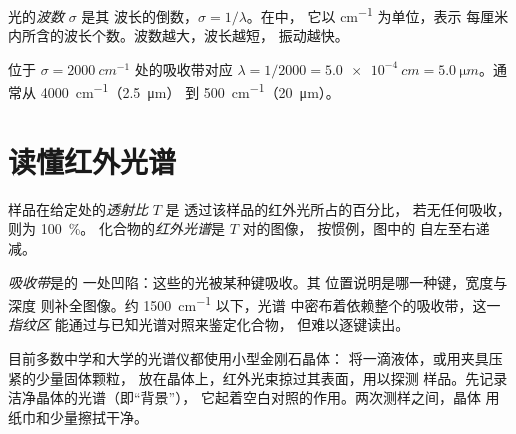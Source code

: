 \begin{definition}[波数]\label{def:g11:infrared:wavenumber}
光的\emph{波数} $\sigma$ 是其
波长的倒数，$\sigma = 1/\lambda$。在中，
它以 \si{cm^{-1}} 为单位，表示
每厘米内所含的波长个数。波数越大，波长越短，
振动越快。
\end{definition}

\begin{example}[由波数求波长]\label{ex:g11:infrared:convert}
位于 $\sigma = \qty{2000}{cm^{-1}}$ 处的吸收带对应
$\lambda = 1/2000 = \qty{5.0e-4}{cm} = \qty{5.0}{\micro m}$。通常从 \qty{4000}{cm^{-1}}（\qty{2.5}{\micro m}）
到 \qty{500}{cm^{-1}}（\qty{20}{\micro m}）。
\end{example}

\section{读懂红外光谱}

\begin{definition}\label{def:g11:infrared:spectrum}
样品在给定处的\emph{透射比} $T$ 是
透过该样品的红外光所占的百分比，
若无任何吸收，则为 \qty{100}{\percent}。
化合物的\emph{红外光谱}是 $T$ 对的图像，
按惯例，图中的
自左至右递减。
\end{definition}

\begin{definition}\label{def:g11:infrared:band}
\emph{吸收带}是的
一处凹陷：这些的光被某种键吸收。其
位置说明是哪一种键，宽度与深度
则补全图像。约 \qty{1500}{cm^{-1}} 以下，光谱
中密布着依赖整个的吸收带，这一\emph{指纹区}
能通过与已知光谱对照来鉴定化合物，
但难以逐键读出。
\end{definition}

\begin{inthelab}[记录光谱]
目前多数中学和大学的光谱仪都使用小型金刚石晶体：
将一滴液体，或用夹具压紧的少量固体颗粒，
放在晶体上，红外光束掠过其表面，用以探测
样品。先记录洁净晶体的光谱（即“背景”），
它起着空白对照的作用。两次测样之间，晶体
用纸巾和少量擦拭干净。
\end{inthelab}

